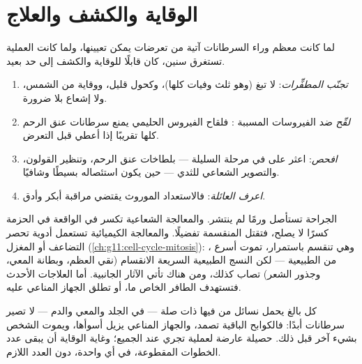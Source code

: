 \section{الوقاية والكشف والعلاج}

\begin{method}\label{met:g11:cancer:prevention}
لما كانت معظم  وراء السرطانات آتية من تعرضات يمكن تعيينها،
ولما كانت العملية تستغرق سنين، كان  قابلًا للوقاية والكشف إلى
حد بعيد.
\begin{enumerate}
  \item \emph{تجنّب المطفِّرات}: لا تبغ (وهو ثلث وفيات  كلها)،
        وكحول قليل، ووقاية من الشمس، ولا إشعاع بلا ضرورة.
  \item \emph{لقّح} ضد الفيروسات المسببة : فلقاح الفيروس
        الحليمي يمنع سرطانات عنق الرحم كلها تقريبًا إذا أعطي قبل
        التعرض.
  \item \emph{افحص}: اعثر على  في مرحلة السليلة --- بلطاخات عنق
        الرحم، وتنظير القولون، والتصوير الشعاعي للثدي --- حين يكون
        استئصاله بسيطًا وشافيًا.
  \item \emph{اعرف العائلة}: فالاستعداد الموروث يقتضي مراقبة أبكر
        وأدق.
\end{enumerate}
\end{method}

\begin{example}\label{ex:g11:cancer:treatments}
الجراحة تستأصل ورمًا لم ينتشر. والمعالجة الشعاعية تكسر  في 
الواقعة في الحزمة كسرًا لا يصلح، فتقتل  المنقسمة تفضيلًا.
والمعالجة الكيميائية تستعمل أدوية تحصر التضاعف أو المغزل
(\cref{ch:g11:cell-cycle-mitosis}):  ، وهي تنقسم باستمرار،
تموت أسرع من  الطبيعية --- لكن النسج الطبيعية السريعة الانقسام
(نقي العظم، وبطانة المعي، وجذور الشعر) تصاب كذلك، ومن هناك تأتي
الآثار الجانبية. أما العلاجات الأحدث فتستهدف  الطافر الخاص
 ما، أو تطلق الجهاز المناعي عليه.
\end{example}

\begin{remark}\label{rem:g11:cancer:everyone}
كل بالغ يحمل نسائل من  فيها  ذات صلة  --- في الجلد
والمعي والدم --- لا تصير سرطانات أبدًا: فالكوابح الباقية تصمد، والجهاز
المناعي يزيل أسوأها، ويموت الشخص بشيء آخر قبل ذلك.  حصيلة
عارضة لعملية تجري عند الجميع؛ وغاية الوقاية أن يبقى عدد الخطوات
المقطوعة، في أي  واحدة، دون العدد اللازم.
\end{remark}

